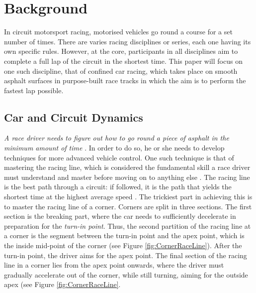 \documentclass{sig-alternate}
\begin{document}
\section{Background} {
\label{sec:background}
%

In circuit motorsport racing, motorised vehicles go round a course for a set number of times. There are varies racing disciplines or series, each one having its own specific rules. However, at the core, participants in all disciplines aim to complete a full lap of the circuit in the shortest time. This paper will focus on one such discipline, that of confined car racing, which takes place on smooth asphalt surfaces in purpose-built race tracks in which the aim is to perform the fastest lap possible.

\subsection{Car and Circuit Dynamics}
\emph{A race driver needs to figure out how to go round a piece of asphalt in the minimum amount of time} \cite{GoingFaster}. In order to do so, he or she needs to develop techniques for more advanced vehicle control. One such technique is that of mastering the racing line, which is considered the fundamental skill a race driver must understand and master before moving on to anything else \cite{GoingFaster}. The racing line is the best path through a circuit: if followed, it is the path that yields the shortest time at the highest average speed \cite{beckman1991physics}. The trickiest part in achieving this is to master the racing line of a corner. Corners are split in three sections. The first section is the breaking part, where the car needs to sufficiently decelerate in preparation for the  \emph{turn-in point}. Thus, the second partition of the racing line at a corner is the segment between the turn-in point and the apex point, which is the inside mid-point of the corner (see Figure \ref{fig:CornerRaceLine}). After the turn-in point, the driver aims for the apex point. The final section of the racing line in a corner lies from the apex point onwards, where the driver must gradually accelerate out of the corner, while still turning, aiming for the outside apex (see Figure \ref{fig:CornerRaceLine}.

}
\end{document}
